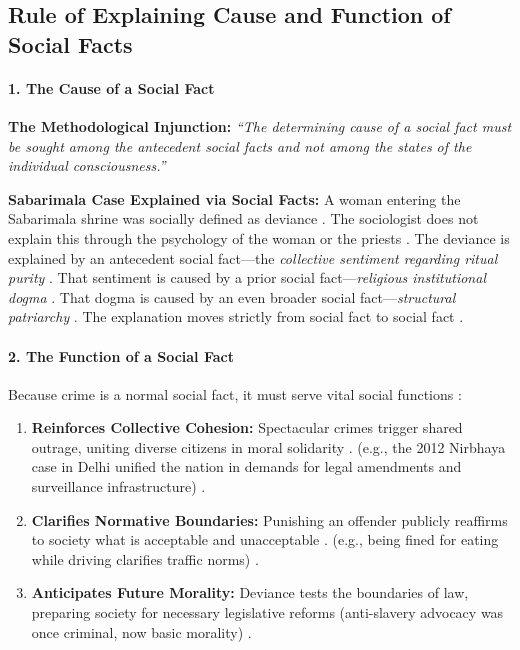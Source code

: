 \subsection{Rule of Explaining Cause and Function of Social Facts}

\paragraph{1. The Cause of a Social Fact}
\begin{KeyConcept}
\textbf{The Methodological Injunction:} \textit{``The determining cause of a social fact must be sought among the antecedent social facts and not among the states of the individual consciousness.''} 
\end{KeyConcept}

\begin{ExampleBox}
\textbf{Sabarimala Case Explained via Social Facts:}
A woman entering the Sabarimala shrine was socially defined as deviance . The sociologist does not explain this through the psychology of the woman or the priests . The deviance is explained by an antecedent social fact---the \textit{collective sentiment regarding ritual purity} . That sentiment is caused by a prior social fact---\textit{religious institutional dogma} . That dogma is caused by an even broader social fact---\textit{structural patriarchy} . The explanation moves strictly from social fact to social fact .
\end{ExampleBox}

\paragraph{2. The Function of a Social Fact}
Because crime is a normal social fact, it must serve vital social functions :
\begin{enumerate}
    \item \textbf{Reinforces Collective Cohesion:} Spectacular crimes trigger shared outrage, uniting diverse citizens in moral solidarity . (e.g., the 2012 Nirbhaya case in Delhi unified the nation in demands for legal amendments and surveillance infrastructure) .
    \item \textbf{Clarifies Normative Boundaries:} Punishing an offender publicly reaffirms to society what is acceptable and unacceptable . (e.g., being fined for eating while driving clarifies traffic norms) .
    \item \textbf{Anticipates Future Morality:} Deviance tests the boundaries of law, preparing society for necessary legislative reforms (anti-slavery advocacy was once criminal, now basic morality) .
\end{enumerate}


